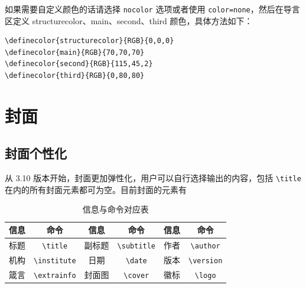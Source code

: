 \documentclass[lang=cn,newtx,10pt,scheme=chinese]{elegantbook}
\begin{document}
如果需要自定义颜色的话请选择 \lstinline{nocolor} 选项或者使用 \lstinline{color=none}，然后在导言区定义 structurecolor、main、second、third 颜色，具体方法如下：
\begin{lstlisting}[tabsize=4]
\definecolor{structurecolor}{RGB}{0,0,0}
\definecolor{main}{RGB}{70,70,70}    
\definecolor{second}{RGB}{115,45,2}    
\definecolor{third}{RGB}{0,80,80}
\end{lstlisting}

\section{封面}

\subsection{封面个性化}

从 3.10 版本开始，封面更加弹性化，用户可以自行选择输出的内容，包括 \lstinline{\title} 在内的所有封面元素都可为空。目前封面的元素有

\begin{table}[htbp]
\centering
\caption{信息与命令对应表}
\begin{tabular}{cccccc}
\toprule
信息 & 命令 & 信息 & 命令 & 信息 & 命令 \\
\midrule
标题 & \lstinline|\title| & 副标题 & \lstinline|\subtitle| & 作者 & \lstinline|\author| \\
机构 & \lstinline|\institute| & 日期 & \lstinline|\date| & 版本 & \lstinline|\version| \\
箴言 & \lstinline|\extrainfo| & 封面图 & \lstinline|\cover| & 徽标 & \lstinline|\logo| \\
\bottomrule
\end{tabular}
\end{table}
\end{document}
